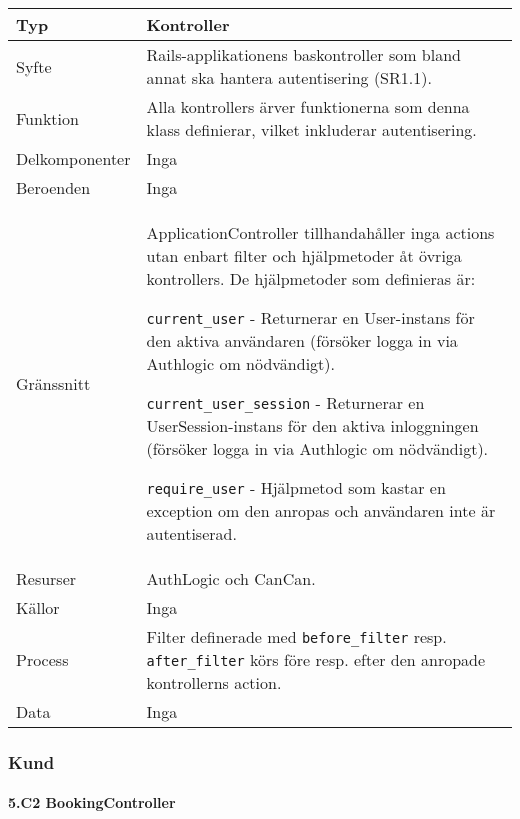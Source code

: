 \documentclass[a4paper, twoside, 11pt, titlepage]{article}
\begin{document}
			\begin {table} [ht] \begin{tabular} {  p{3.5cm} p{9.6cm} }
				\hline
				{Typ} & {Kontroller} \\
				\hline
				{Syfte} & {Rails-applikationens baskontroller som bland annat ska hantera autentisering (SR1.1).} \\
				\hline
				{Funktion} & {Alla kontrollers ärver funktionerna som denna klass definierar, vilket inkluderar autentisering.} \\
				\hline
				{Delkomponenter} & {Inga} \\
				\hline
				{Beroenden} & {Inga} \\
				\hline
				{Gränssnitt} & {ApplicationController tillhandahåller inga actions utan enbart filter och hjälpmetoder åt övriga kontrollers. De hjälpmetoder som definieras är:

{\tt current\_user} - Returnerar en User-instans för den aktiva användaren (försöker logga in via Authlogic om nödvändigt).

{\tt current\_user\_session} - Returnerar en UserSession-instans för den aktiva inloggningen (försöker logga in via Authlogic om nödvändigt).

{\tt require\_user} - Hjälpmetod som kastar en exception om den anropas och användaren inte är autentiserad.} \\
				\hline
				{Resurser} & {AuthLogic och CanCan.} \\
				\hline
				{Källor} & {Inga} \\
				\hline
				{Process} & {Filter definerade med {\tt before\_filter} resp. {\tt after\_filter} körs före resp. efter den anropade kontrollerns action.} \\
				\hline
				{Data} & {Inga} \\
				\hline
			\end{tabular} \end{table} \FloatBarrier


		\subsubsection{Kund}



			\paragraph{5.C2 BookingController}\
\end{document}
